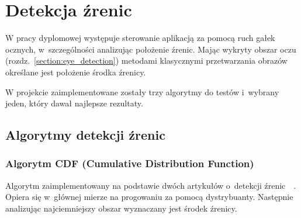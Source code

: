 \newpage

\section{Detekcja źrenic}

W pracy dyplomowej występuje sterowanie aplikacją za pomocą ruch gałek ocznych, w~szczególności analizując położenie źrenic. Mając wykryty obszar oczu (rozdz.~\hyperref[{section:eye_detection}]{\ref{section:eye_detection}}) metodami klasycznymi przetwarzania obrazów określane jest położenie środka źrenicy.

\par

W projekcie zaimplementowane zostały trzy algorytmy do testów i~wybrany jeden, który dawał najlepsze rezultaty.

\subsection{Algorytmy detekcji źrenic}

\subsubsection{Algorytm CDF (Cumulative Distribution Function)}
Algorytm zaimplementowany na podstawie dwóch artykułów o~detekcji źrenic~\cite{IMECSPupilCDFAnalysis}~\cite{EyePupilWebCam}. Opiera się w~głównej mierze na progowaniu za pomocą dystrybuanty. Następnie analizując najciemniejszy obszar wyznaczany jest środek źrenicy.

